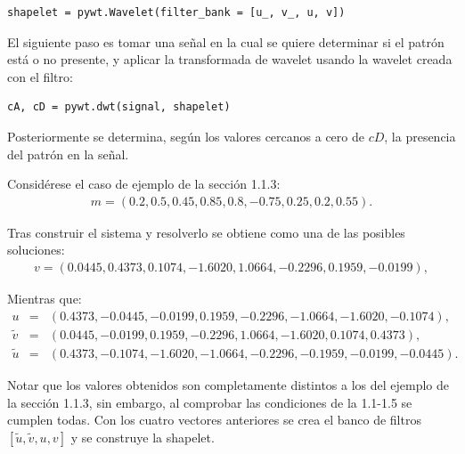 \begin{lstlisting}[caption=Creaci\'on de una wavelet a partir del banco de filtros.]
shapelet = pywt.Wavelet(filter_bank = [u_, v_, u, v])
\end{lstlisting}

\par El siguiente paso es tomar una se\~nal en la cual se quiere determinar si el patr\'on est\'a o no presente, y aplicar la transformada de wavelet usando la wavelet creada con el filtro:\\

\begin{lstlisting}[caption=C\'alculo de la transformada discreta de Wavelet usando pywt.]
cA, cD = pywt.dwt(signal, shapelet)
\end{lstlisting}

\par Posteriormente se determina, seg\'un los valores cercanos a cero de $cD$, la presencia del patr\'on en la se\~nal.

Consid\'erese el caso de ejemplo de la secci\'on 1.1.3:
\begin{eqnarray}
m=(0.2,0.5,0.45,0.85,0.8,-0.75,0.25,0.2,0.55).\nonumber
\end{eqnarray}

\par Tras construir el sistema y resolverlo se obtiene como una de las posibles soluciones:
\begin{eqnarray}
v=(0.0445, 0.4373, 0.1074, -1.6020, 1.0664, -0.2296, 0.1959, -0.0199),\nonumber
\end{eqnarray}

Mientras que:
\begin{eqnarray}
u&=&(0.4373, -0.0445, -0.0199, 0.1959, -0.2296, -1.0664, -1.6020, -0.1074),\nonumber\\
\tilde{v}&=&(0.0445, -0.0199, 0.1959, -0.2296, 1.0664, -1.6020, 0.1074, 0.4373),\nonumber\\
\tilde{u}&=&(0.4373, -0.1074, -1.6020, -1.0664, -0.2296, -0.1959, -0.0199, -0.0445).\nonumber
\end{eqnarray}

\par Notar que los valores obtenidos son completamente distintos a los del ejemplo de la secci\'on 1.1.3, sin embargo, al comprobar las condiciones de la 1.1-1.5 se cumplen todas. Con los cuatro vectores anteriores se crea el banco de filtros $[\tilde{u},\tilde{v},u,v]$ y se construye la shapelet.\\

